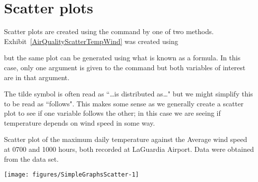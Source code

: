 \section{Scatter plots} 
 
Scatter plots are created using the  command by one of two methods. Exhibit~\ref{AirQualityScatterTempWind} was created using 
\begin{knitrout}
\color{fgcolor}\begin{kframe}
\begin{alltt}
\hlstd{> }
\end{alltt}
\end{kframe}
\end{knitrout}
but the same plot can be generated using what is known as a formula. In this case, only one argument is given to the  command but both variables of interest are in that argument. 
\begin{knitrout}
\color{fgcolor}\begin{kframe}
\begin{alltt}
\hlstd{> }\hlopt{~}
\end{alltt}
\end{kframe}
\end{knitrout}
The tilde symbol is often read as ``\ldots is distributed as\ldots" but we might simplify this to be read as ``follows". This makes some sense as we generally create a scatter plot to see if one variable follows the other; in this case we are seeing if temperature depends on wind speed in some way. 
 
\begin{exhibit} 
\begin{center} 
\caption{Scatter plot of the maximum daily temperature against the Average wind speed at 0700 and 1000 hours, both recorded at LaGuardia Airport. Data were obtained from the  data set.} 
\label{AirQualityScatterTempWind} 
\begin{knitrout}
\color{fgcolor}\begin{kframe}
\begin{alltt}
\hlstd{> }
\end{alltt}
\end{kframe}
\texttt{[image: figures/SimpleGraphsScatter-1]} 

\end{knitrout}
\end{center} 
\end{exhibit} 
 
